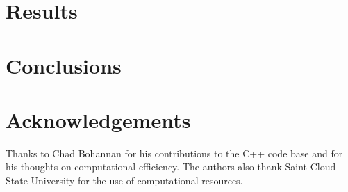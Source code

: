 \documentclass[preprint,12pt]{elsarticle}
\begin{document}

\section{Results}\label{sec:bode}



\section{Conclusions}\label{conclusions}
%





\section*{Acknowledgements}

Thanks to Chad Bohannan for his contributions to the C++ code base and
for his thoughts on computational efficiency. The authors also thank
Saint Cloud State University for the use of computational resources.














\end{document}
